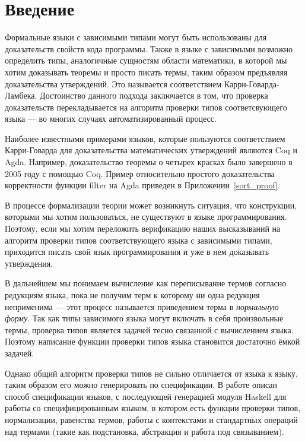 \section*{Введение}
Формальные языки с зависимыми типами могут быть использованы для доказательств свойств кода программы. Также в языке с зависимыми возможно определить типы, аналогичные сущностям области математики, в которой мы хотим доказывать теоремы и просто писать термы, таким образом предъявляя доказательства утверждений. Это называется соответствием Карри-Говарда-Ламбека\cite{curry_how}. Достоинство данного подхода заключается в том, что проверка доказательств перекладывается на алгоритм проверки типов соответсвующего языка --- во многих случаях автоматизированный процесс.

Наиболее известными примерами языков, которые пользуются соответствием Карри-Говарда для доказательства математических утверждений являются Coq\cite{coq} и Agda\cite{agda}. Например, доказательство теоремы о четырех красках было завершено в 2005 году с помощью Coq\cite{weisstein2002four}.
Пример относительно простого доказательства корректности функции filter на Agda приведен в Приложении~\ref{sort_proof}.

\hfill

В процессе формализации теории может возникнуть ситуация, что конструкции, которыми мы хотим пользоваться, не существуют в языке программирования. Поэтому, если мы хотим переложить верификацию наших высказываний на алгоритм проверки типов соответствующего языка с зависимыми типами, приходится писать свой язык программирования и уже в нем доказывать утверждения.

В дальнейшем мы понимаем вычисление как переписывание термов согласно редукциям языка, пока не получим терм к которому ни одна редукция неприменима --- этот процесс называется приведением терма в \textit{нормальную форму}. Так как типы зависимого языка могут включать в себя произвольные термы, проверка типов является задачей тесно связанной с вычислением языка. Поэтому написание функции проверки типов языка становится достаточно ёмкой задачей.

Однако общий алгоритм проверки типов не сильно отличается от языка к языку, таким образом его можно генерировать по спецификации. В работе описан способ спецификации языков, с последующей генерацией модуля Haskell\cite{haskell} для работы со специфицированным языком, в котором есть функции проверки типов, нормализации, равенства термов, работы с контекстами и стандартных операций над термами (такие как подстановка, абстракция и работа под связыванием).

